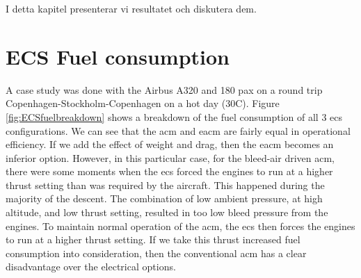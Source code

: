 \documentclass[english]{kththesis}
\newenvironment{swedishnotes}%
  {\begin{center}
      \selectlanguage{swedish}
      \color{blue}}%
    {\end{center}
    \selectlanguage{USenglish}}
\begin{document}
\begin{swedishnotes}
I detta kapitel presenterar vi resultatet och diskutera dem.
\end{swedishnotes}

\section{ECS Fuel consumption}
\label{sec:ECSFuelResult}
A case study was done with the Airbus A320 and 180 pax on a round trip Copenhagen-Stockholm-Copenhagen on a hot day (30\degree C). Figure \ref{fig:ECSfuelbreakdown} shows a breakdown of the fuel consumption of all 3 \acrshort{ecs} configurations. We can see that the \acrshort{acm} and \acrshort{eacm} are fairly equal in operational efficiency. If we add the effect of weight and drag, then the \acrshort{eacm} becomes an inferior option. However, in this particular case, for the bleed-air driven \acrshort{acm}, there were some moments when the \acrshort{ecs} forced the engines to run at a higher thrust setting than was required by the aircraft. This happened during the majority of the descent. The combination of low ambient pressure, at high altitude, and low thrust setting, resulted in too low bleed pressure from the engines. To maintain normal operation of the \acrshort{acm}, the \acrshort{ecs} then forces the engines to run at a higher thrust setting. If we take this thrust increased fuel consumption into consideration, then the conventional \acrshort{acm} has a clear disadvantage over the electrical options.

\end{document}
